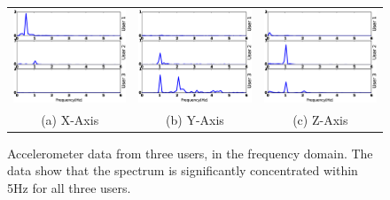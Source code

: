 \begin{figure}[t]
\begin{center}
\begin{tabular}{ccc}
\includegraphics [width=.33\linewidth]{figure/freq_x.eps}&
\includegraphics [width=.33\linewidth]{figure/freq_y.eps}&
\includegraphics [width=.33\linewidth]{figure/freq_z.eps}\\
(a) X-Axis & (b) Y-Axis & (c) Z-Axis \\
\end{tabular}

\end{center}
\caption{\label{fig:raw_freq} Accelerometer data from three users, in the frequency
domain. The data show that the spectrum is significantly
concentrated within 5Hz for all three users.}
\end{figure}

